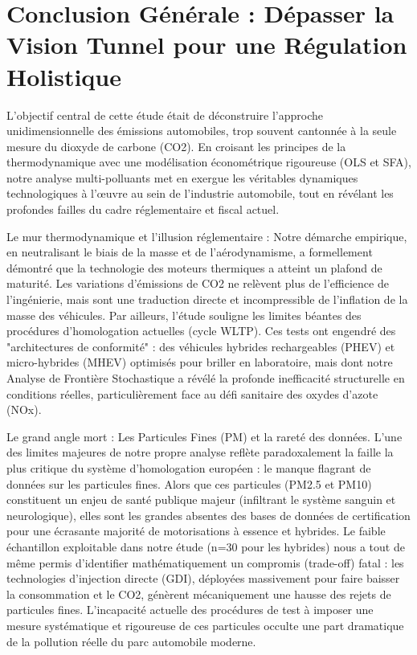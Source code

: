 \section{Conclusion Générale : Dépasser la Vision Tunnel pour une Régulation Holistique}

L'objectif central de cette étude était de déconstruire l'approche unidimensionnelle des émissions automobiles, trop souvent cantonnée à la seule mesure du dioxyde de carbone (CO2). En croisant les principes de la thermodynamique avec une modélisation économétrique rigoureuse (OLS et SFA), notre analyse multi-polluants met en exergue les véritables dynamiques technologiques à l'œuvre au sein de l'industrie automobile, tout en révélant les profondes failles du cadre réglementaire et fiscal actuel.

\vspace{0.6em}

Le mur thermodynamique et l'illusion réglementaire : Notre démarche empirique, en neutralisant le biais de la masse et de l'aérodynamisme, a formellement démontré que la technologie des moteurs thermiques a atteint un plafond de maturité. Les variations d'émissions de CO2 ne relèvent plus de l'efficience de l'ingénierie, mais sont une traduction directe et incompressible de l'inflation de la masse des véhicules. Par ailleurs, l'étude souligne les limites béantes des procédures d'homologation actuelles (cycle WLTP). Ces tests ont engendré des "architectures de conformité" : des véhicules hybrides rechargeables (PHEV) et micro-hybrides (MHEV) optimisés pour briller en laboratoire, mais dont notre Analyse de Frontière Stochastique a révélé la profonde inefficacité structurelle en conditions réelles, particulièrement face au défi sanitaire des oxydes d'azote (NOx).

\vspace{0.6em}

Le grand angle mort : Les Particules Fines (PM) et la rareté des données. L'une des limites majeures de notre propre analyse reflète paradoxalement la faille la plus critique du système d'homologation européen : le manque flagrant de données sur les particules fines. Alors que ces particules (PM2.5 et PM10) constituent un enjeu de santé publique majeur (infiltrant le système sanguin et neurologique), elles sont les grandes absentes des bases de données de certification pour une écrasante majorité de motorisations à essence et hybrides. Le faible échantillon exploitable dans notre étude (n=30 pour les hybrides) nous a tout de même permis d'identifier mathématiquement un compromis (trade-off) fatal : les technologies d'injection directe (GDI), déployées massivement pour faire baisser la consommation et le CO2, génèrent mécaniquement une hausse des rejets de particules fines. L'incapacité actuelle des procédures de test à imposer une mesure systématique et rigoureuse de ces particules occulte une part dramatique de la pollution réelle du parc automobile moderne.

